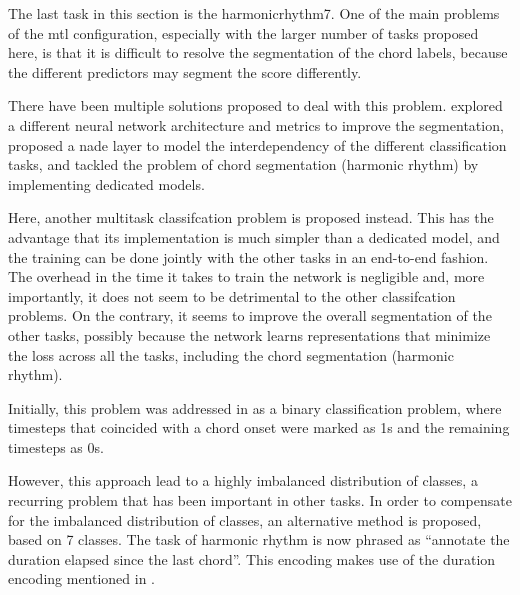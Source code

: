 
The last task in this section is the \gls{harmonicrhythm7}.
One of the main problems of the \gls{mtl} configuration,
especially with the larger number of tasks proposed here, is
that it is difficult to resolve the segmentation of the
chord labels, because the different predictors may segment
the score differently.

There have been multiple solutions proposed to deal with
this problem. \textcite{chen2021attend} explored a different
neural network architecture and metrics to improve the
segmentation, \textcite{micchi2021deep} proposed a
\gls{nade} layer to model the interdependency of the
different classification tasks, \textcite{mcleod2021modular}
and  \textcite{wu2021melody} tackled the problem of chord
segmentation (harmonic rhythm) by implementing dedicated
models. 

Here, another multitask classifcation problem is proposed
instead. This has the advantage that its implementation is
much simpler than a dedicated model, and the training can be
done jointly with the other tasks in an end-to-end fashion.
The overhead in the time it takes to train the network is
negligible and, more importantly, it does not seem to be
detrimental to the other classifcation problems. On the
contrary, it seems to improve the overall segmentation of
the other tasks, possibly because the network learns
representations that minimize the loss across all the tasks,
including the chord segmentation (harmonic rhythm).

Initially, this problem was addressed in
\textcite{napoleslopez2021augmentednet} as a binary
classification problem, where timesteps that coincided with
a chord onset were marked as 1s and the remaining timesteps
as 0s.

However, this approach lead to a highly imbalanced
distribution of classes, a recurring problem that has been
important in other tasks. In order to compensate for the
imbalanced distribution of classes, an alternative method is
proposed, based on 7 classes. The task of harmonic rhythm is
now phrased as ``annotate the duration elapsed since the
last chord''. This encoding makes use of the duration
encoding mentioned in
.
